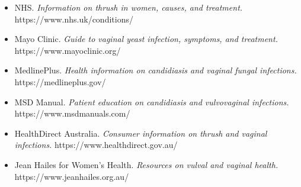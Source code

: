 \begin{itemize}
    \item NHS. \textit{Information on thrush in women, causes, and treatment.} https://www.nhs.uk/conditions/
    \item Mayo Clinic. \textit{Guide to vaginal yeast infection, symptoms, and treatment.} https://www.mayoclinic.org/
    \item MedlinePlus. \textit{Health information on candidiasis and vaginal fungal infections.} https://medlineplus.gov/
    \item MSD Manual. \textit{Patient education on candidiasis and vulvovaginal infections.} https://www.msdmanuals.com/
    \item HealthDirect Australia. \textit{Consumer information on thrush and vaginal infections.} https://www.healthdirect.gov.au/
    \item Jean Hailes for Women's Health. \textit{Resources on vulval and vaginal health.} https://www.jeanhailes.org.au/
\end{itemize}
